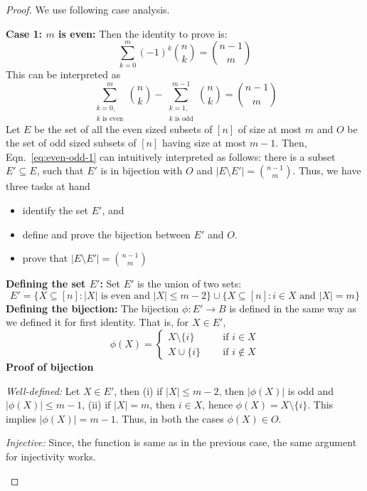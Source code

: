 \begin{proof}
We use following case analysis. 
\begin{description}
\item \textbf{\textbf{Case 1:} $m$ is even:} Then the identity to prove is:
\begin{equation} \label{eq:even-odd}
    \sum_{k=0}^m (-1)^k{n\choose k} = {n-1\choose m}
\end{equation}
This can be interpreted as 
\begin{equation} \label{eq:even-odd-1}
    \sum_{\substack{k=0,\\k\text{ is even}}}^m {n\choose k} -  \sum_{\substack{k=1,\\k\text{ is odd}}}^{m-1} {n\choose k} = {n-1\choose m}
\end{equation}
Let $E$ be the set of all the even sized subsets of $[n]$ of size at most $m$ and $O$ be the set of odd sized subsets of $[n]$ having size at most $m-1$. Then, Eqn.~\eqref{eq:even-odd-1} can intuitively interpreted as follows: there is a subset $E'\subseteq E$, such that $E'$ is in bijection with $O$ and $|E\setminus E'| = {n-1\choose m}$. Thus, we have three tasks at hand
\begin{itemize}
    \item identify the set $E'$, and
    \item define and prove the bijection between $E'$ and $O$.
    \item prove that $|E\setminus E'| = {n-1\choose m}$
\end{itemize}
\textbf{Defining the set $E'$:} Set $E'$ is the union of two sets: 
$$E' = \{X\subseteq [n]: |X| \textrm{ is even and } |X|\le m-2\}\cup\{X\subseteq [n]: i\in X \textrm{ and } |X| = m\}$$
\textbf{Defining the bijection:} The bijection $\phi:E'\rightarrow B$ is defined in the same way as we defined it for first identity. That is, for $X\in E'$,
\[
\phi(X) = 
\begin{cases}
X\setminus \{i\} & ~~~~~\text{ if } i\in X\\
X\cup\{i\} & ~~~~~\text{ if } i\not\in X
\end{cases}
\]
\textbf{Proof of bijection}
\begin{description}
\item \textit{Well-defined:} Let $X\in E'$, then (i) if $|X|\le m-2$, then $|\phi(X)|$ is odd and $|\phi(X)|\le m-1$, (ii) if $|X| = m$, then $i\in X$, hence $\phi(X) = X\setminus \{i\}$. This implies $|\phi(X)| = m-1$. Thus, in both the cases $\phi(X)\in O$.
\item \textit{Injective:} Since, the function is same as in the previous case, the same argument for injectivity works.

\end{description}
\end{description}
\end{proof}
